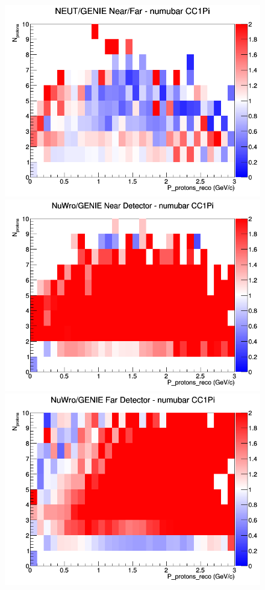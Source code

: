 \documentclass[12pt]{article}
\begin{document}
\begin{figure}[h]
\endminipage
{}
\includegraphics[width=\linewidth]{eff_N_P/FGT/protons/ratios/CC1Pi_NEUT_GENIE_numubar_NF_N_P.png}
\endminipage
\newline
{}
\includegraphics[width=\linewidth]{eff_N_P/FGT/protons/ratios/CC1Pi_NuWro_GENIE_numubar_near_N_P.png}
\endminipage
{}
\includegraphics[width=\linewidth]{eff_N_P/FGT/protons/ratios/CC1Pi_NuWro_GENIE_numubar_far_N_P.png}

\end{figure}
\end{document}
